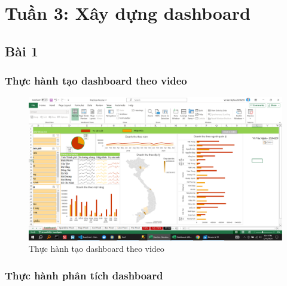 \documentclass{article}
\begin{document}
\tableofcontents
\newpage
\listoffigures
\newpage
\section{Tuần 3: Xây dựng dashboard}
\subsection{Bài 1}

\subsubsection{Thực hành tạo dashboard theo video}

\begin{figure}[H]
\centering
\includegraphics[scale = 0.15]{Bai1/ThucHanh/0.png}
\caption{Thực hành tạo dashboard theo video}
\end{figure}

\subsubsection{Thực hành phân tích dashboard}
\end{document}
